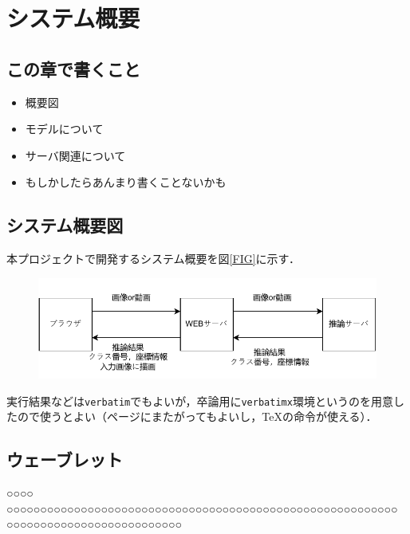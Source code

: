 

\chapter{システム概要}
\section{この章で書くこと}
\begin{itemize}
	\item 概要図
	\item モデルについて
	\item サーバ関連について
	\item もしかしたらあんまり書くことないかも
\end{itemize}


\section{システム概要図}
本プロジェクトで開発するシステム概要を図\ref{FIG}に示す．
\begin{figure}
	\centering
	\includegraphics [width=\linewidth]{fig/system.pdf}

\end{figure}



実行結果などは\texttt{verbatim}でもよいが，卒論用に\texttt{verbatimx}環境というのを用意したので使うとよい（ページにまたがってもよいし，\TeX の命令が使える）．






\section{ウェーブレット}\label{AAAB}
○○○○ ○○○○○○○○○○○○○○○○○○○○○○○○○○○○○○○○○○○○○○○○○○○○○○○○○○○○○○○○○○ ○○○○○○○○○○○○○○○○○○○○○○○○○○

